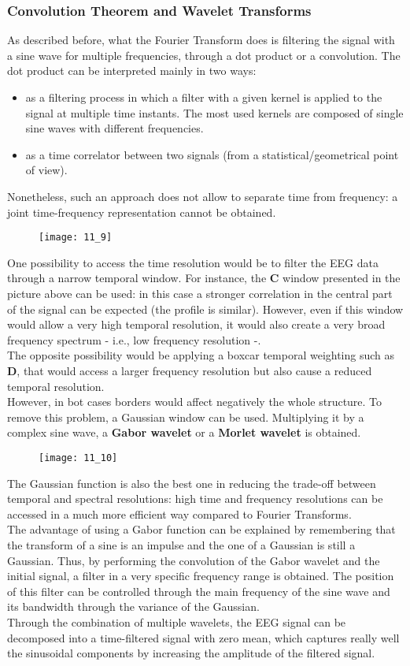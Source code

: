 \subsubsection{Convolution Theorem and Wavelet Transforms}
As described before, what the Fourier Transform does is filtering the signal with a sine wave for multiple
frequencies, through a dot product or a convolution. The dot product can be interpreted mainly in two ways:
\begin{itemize}
    \item as a filtering process in which a filter with a given kernel is applied to the signal at multiple
          time instants. The most used kernels are composed of single sine waves with different frequencies.
    \item as a time correlator between two signals (from a statistical/geometrical point of view).
\end{itemize}
Nonetheless, such an approach does not allow to separate time from frequency: a joint time-frequency
representation cannot be obtained.
\begin{figure}[H]
    \texttt{[image: 11\_9]}
    \centering
\end{figure}
One possibility to access the time resolution would be to filter the EEG data through a narrow temporal window.
For instance, the \textbf{C} window presented in the picture above can be used: in this case a stronger
correlation in the central part of the signal can be expected (the profile is similar). However, even if this
window would allow a very high temporal resolution, it would also create a very broad frequency spectrum - i.e.,
low frequency resolution -.\\
The opposite possibility would be applying a boxcar temporal weighting such as \textbf{D}, that would access a
larger frequency resolution but also cause a reduced temporal resolution.\\
However, in bot cases borders would affect negatively the whole structure. To remove this problem, a Gaussian
window can be used. Multiplying it by a complex sine wave, a \textbf{Gabor wavelet} or a
\textbf{Morlet wavelet} is obtained.
\begin{figure}[H]
    \texttt{[image: 11\_10]}
    \centering
\end{figure}
The Gaussian function is also the best one in reducing the trade-off between
temporal and spectral resolutions: high time and frequency resolutions can be accessed in a much more efficient
way compared to Fourier Transforms.\\
The advantage of using a Gabor function can be explained by remembering that the transform of a sine is an
impulse and the one of a Gaussian is still a Gaussian. Thus, by performing the convolution of the Gabor wavelet
and the initial signal, a filter in a very specific frequency range is obtained. The position of this filter
can be controlled through the main frequency of the sine wave and its bandwidth through the variance of the Gaussian.\\
Through the combination of multiple wavelets, the EEG signal can be decomposed into a time-filtered signal
with zero mean, which captures really well the sinusoidal components by increasing the amplitude of the filtered
signal.
